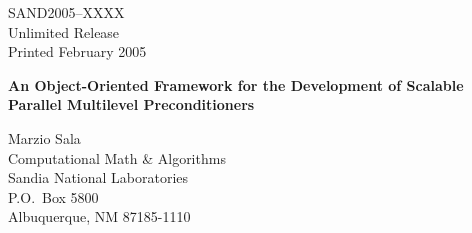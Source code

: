 \documentclass{article}[11pt]
\def\draft{%
\special{!userdict begin /bop-hook{gsave
200 30 translate 65 rotate
/Times-Roman findfont 216 scalefont setfont
0 0 moveto 0.9 setgray (DRAFT) show grestore}def end}
}
\begin{document}

\setcounter{page}{3}

\large


%
%
\begin{center}
SAND2005--XXXX \\
Unlimited Release \\
Printed February 2005
\end{center}

\vspace{0.2in}

\begin{center}
{\Large {\bf An Object-Oriented Framework 
  for the Development of Scalable Parallel Multilevel Preconditioners}}

\vspace*{0.8in}
Marzio  Sala \\
Computational Math \& Algorithms \\
Sandia National Laboratories\\
P.O.~Box 5800 \\
Albuquerque, NM 87185-1110
\vspace*{1in}

\end{center}
\end{document}
